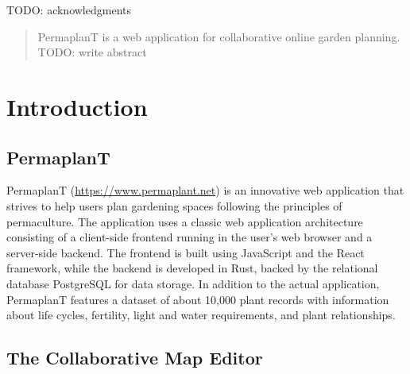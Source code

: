 \documentclass[final,draft,oneside]{vutinfth}
\begin{document}
\frontmatter

\addstatementpage

\begin{acknowledgements*}

TODO: acknowledgments

\end{acknowledgements*}

\begin{abstract}
    PermaplanT is a web application for collaborative online garden planning. TODO: write abstract
\end{abstract}



\tableofcontents %

\mainmatter

\chapter{Introduction}

\section{PermaplanT}

PermaplanT (\url{https://www.permaplant.net}) is an innovative web application that strives to help users plan gardening spaces following the principles of permaculture.
The application uses a classic web application architecture consisting of a client-side frontend running in the user's web browser and a server-side backend.
The frontend is built using JavaScript and the React framework, while the backend is developed in Rust, backed by the relational database PostgreSQL for data storage.
In addition to the actual application, PermaplanT features a dataset of about 10,000 plant records with information about life cycles, fertility, light and water requirements, and plant relationships.

\section{The Collaborative Map Editor}
\end{document}
